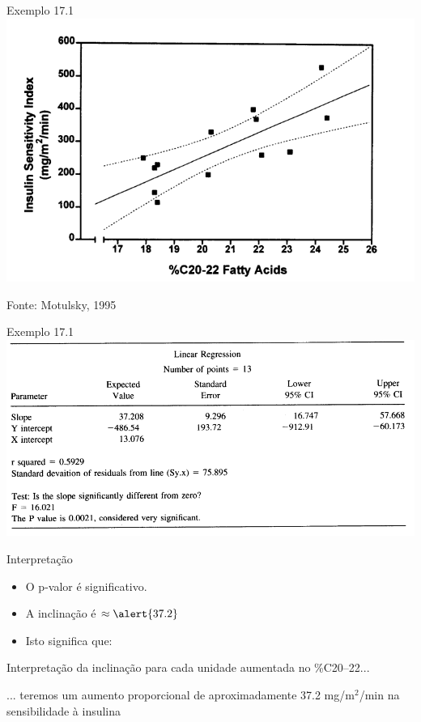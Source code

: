 \documentclass{beamer}
\begin{document}
\begin{frame}{\scriptsize Exemplo 17.1}
  \centering
  \includegraphics[width=.9\textwidth]{Cap18-19/regressao1}

  \vfill
  \hfill \footnotesize Fonte: Motulsky, 1995
\end{frame}

\begin{frame}{\scriptsize Exemplo 17.1}
  \centering
  \includegraphics[width=1.2\textwidth]{Cap18-19/regressao2}
\end{frame}

\begin{frame}{\scriptsize Interpretação}
  \begin{itemize}
  \item O p-valor é significativo.
  \item A inclinação é $\approx \alert{37.2}$
  \item Isto significa que:
  \end{itemize}
  \begin{block}{Interpretação da inclinação}
    \footnotesize
    para cada unidade aumentada no \%C20--22...

    \bigskip
    ... teremos um aumento proporcional de aproximadamente 37.2 mg/m$^2$/min na sensibilidade à insulina
  \end{block}
\end{frame}
\end{document}
